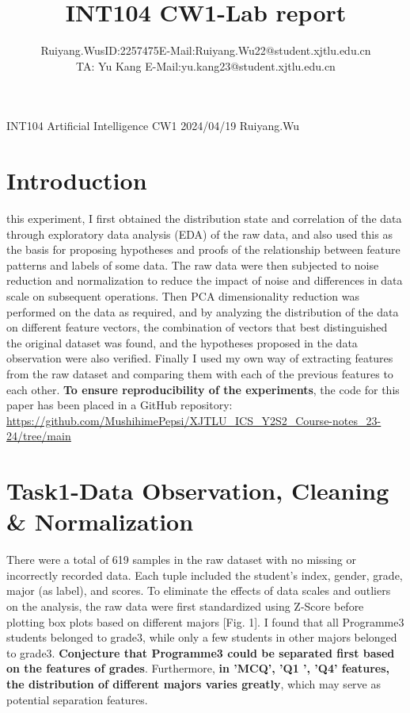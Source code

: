 \documentclass[journal]{IEEEtai}
\begin{document}
\title{INT104 CW1-Lab report} 


\author{Ruiyang.Wu\quad	sID:2257475\quad E-Mail:Ruiyang.Wu22@student.xjtlu.edu.cn
	\\
	TA: Yu Kang \quad E-Mail:yu.kang23@student.xjtlu.edu.cn
}

{INT104 Artificial Intelligence CW1 2024/04/19 Ruiyang.Wu}

\maketitle



\section{\textbf{Introduction}}

 this experiment, I first obtained the distribution state and correlation of the data through exploratory data analysis (EDA) of the raw data, and also used this as the basis for proposing hypotheses and proofs of the relationship between feature patterns and labels of some data. The raw data were then subjected to noise reduction and normalization to reduce the impact of noise and differences in data scale on subsequent operations. Then PCA dimensionality reduction was performed on the data as required, and by analyzing the distribution of the data on different feature vectors, the combination of vectors that best distinguished the original dataset was found, and the hypotheses proposed in the data observation were also verified. Finally I used my own way of extracting features from the raw dataset and comparing them with each of the previous features to each other. \textbf{To ensure reproducibility of the experiments}, the code for this paper has been placed in a GitHub repository:  
\href{https://github.com/MushihimePepsi/XJTLU_ICS_Y2S2_Course-notes_23-24/tree/main}{\ul{https://github.com/MushihimePepsi/XJTLU\_ICS\_Y2S2\_Course-notes\_23-24/tree/main}}


\section{\textbf{Task1-Data Observation, Cleaning \& Normalization}}

There were a total of 619 samples in the raw dataset with no missing or incorrectly recorded data. Each tuple included the student's index, gender, grade, major (as label), and scores. To eliminate the effects of data scales and outliers on the analysis, the raw data were first standardized using Z-Score before plotting box plots based on different majors [Fig. 1]. I found that all Programme3 students belonged to grade3, while only a few students in other majors belonged to grade3. \textbf{Conjecture that Programme3 could be separated first based on the features of grades}. Furthermore, \textbf{in 'MCQ', 'Q1 ', 'Q4' features, the distribution of different majors varies greatly}, which may serve as potential separation features.
\end{document}
